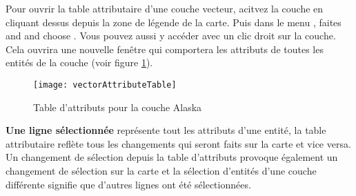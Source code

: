 Pour ouvrir la table attributaire d'une couche vecteur, acitvez la couche en cliquant dessus depuis la zone de légende de la carte. Puis dans le menu  , faites and and choose . Vous pouvez aussi y accéder avec un clic droit sur la couche. Cela ouvrira une nouvelle fenêtre qui comportera les attributs de toutes les entités de la couche (voir figure \ref{fig:attributetable}).

\begin{figure}[ht]
   \begin{center}
   \texttt{[image: vectorAttributeTable]}
    \caption{Table d'attributs pour la couche Alaska \nixcaption}\label{fig:attributetable}
\end{center} 
\end{figure}



\textbf{Une ligne sélectionnée} représente tout les attributs d'une entité, la table attributaire reflète tous les changements qui seront faits sur la carte et vice versa. Un changement de sélection depuis la table d'attributs provoque également un changement de sélection sur la carte et la sélection d'entités d'une couche différente signifie que d'autres lignes ont été sélectionnées.


